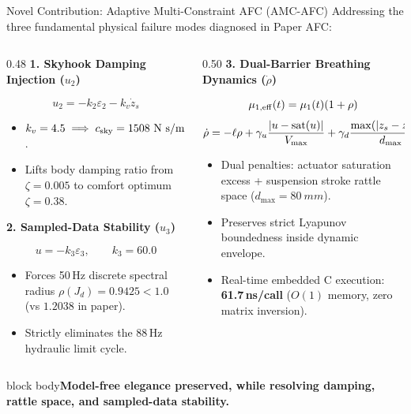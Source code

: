 \documentclass[aspectratio=169,10pt]{beamer}
\newcommand{\takeaway}[1]{\vfill\begin{beamercolorbox}[wd=\linewidth,sep=1ex]{block body}\color{accent}\bfseries #1\end{beamercolorbox}}
\begin{document}
\begin{frame}{Novel Contribution: Adaptive Multi-Constraint AFC (AMC-AFC)}
\footnotesize
Addressing the three fundamental physical failure modes diagnosed in Paper AFC:
\par\vspace{0.05cm}
\begin{columns}[T]
\begin{column}{0.48\linewidth}
{\color{accent}\bfseries 1. Skyhook Damping Injection ($u_2$)}
\par\vspace{0.02cm}
\[ u_2 = -k_2\varepsilon_2 - k_v \dot{z}_s \]
\begin{itemize}\itemsep1pt
\item $k_v = 4.5 \implies c_{\rm sky} = 1508\text{ N s/m}$.
\item Lifts body damping ratio from $\zeta = 0.005$ to comfort optimum $\zeta = 0.38$.
\end{itemize}
\par\vspace{0.08cm}
{\color{accent}\bfseries 2. Sampled-Data Stability ($u_3$)}
\par\vspace{0.02cm}
\[ u = -k_3 \varepsilon_3, \qquad k_3 = 60.0 \]
\begin{itemize}\itemsep1pt
\item Forces 50\,Hz discrete spectral radius $\rho(J_d) = 0.9425 < 1.0$ (vs $1.2038$ in paper).
\item Strictly eliminates the 88\,Hz hydraulic limit cycle.
\end{itemize}
\end{column}
\begin{column}{0.50\linewidth}
{\color{accent}\bfseries 3. Dual-Barrier Breathing Dynamics ($\dot\rho$)}
\par\vspace{0.02cm}
\[ \mu_{1,\rm eff}(t) = \mu_1(t)(1+\rho) \]
\[ \dot\rho = -\ell\rho + \gamma_u\frac{|u-\operatorname{sat}(u)|}{V_{\max}} + \gamma_d\frac{\max(|z_s - z_u| - d_{\rm safe}, 0)}{d_{\max} - d_{\rm safe}} \]
\begin{itemize}\itemsep1pt
\item Dual penalties: actuator saturation excess + suspension stroke rattle space ($d_{\max} = \SI{80}{mm}$).
\item Preserves strict Lyapunov boundedness inside dynamic envelope.
\item Real-time embedded C execution: \textbf{61.7\,ns/call} ($O(1)$ memory, zero matrix inversion).
\end{itemize}
\end{column}
\end{columns}
\par\vspace{0.05cm}
\takeaway{Model-free elegance preserved, while resolving damping, rattle space, and sampled-data stability.}
\end{frame}
\end{document}
